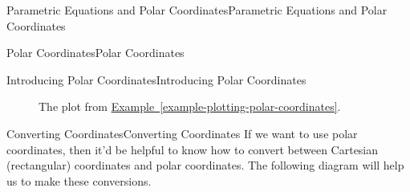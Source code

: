 \documentclass[10pt,]{book}
\numberwithin{equation}{section}
\begin{document}
\begin{chapterptx}{Parametric Equations and Polar Coordinates}{}{Parametric Equations and Polar Coordinates}{}{}
\begin{sectionptx}{Polar Coordinates}{}{Polar Coordinates}{}{}
\begin{subsectionptx}{Introducing Polar Coordinates}{}{Introducing Polar Coordinates}{}{}
\begin{figure}
{
}
\caption{The plot from \hyperref[example-plotting-polar-coordinates]{Example~\ref{example-plotting-polar-coordinates}}.\label{figure-example-polar-coords}}
\end{figure}
\end{subsectionptx}
%
%
\typeout{************************************************}
\typeout{************************************************}
%
\begin{subsectionptx}{Converting Coordinates}{}{Converting Coordinates}{}{}\label{subsection-converting-coordinates}
\hypertarget{p-802}{}%
If we want to use polar coordinates, then it'd be helpful to know how to convert between Cartesian (rectangular) coordinates and polar coordinates. The following diagram will help us to make these conversions.%
\begin{figure}
\centering
{
    }
\end{figure}
\end{subsectionptx}
\end{sectionptx}
\end{chapterptx}
\end{document}
